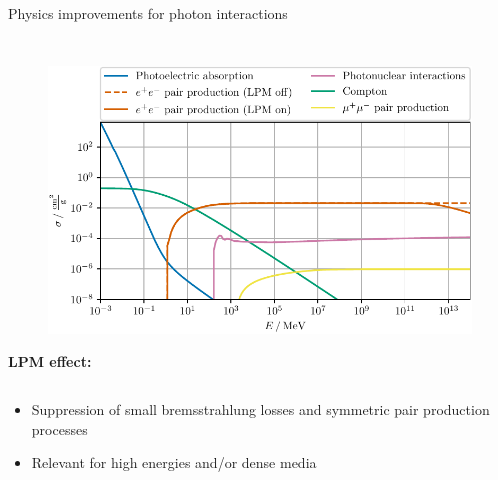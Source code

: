 \documentclass[t]{beamer}
\begin{document}
\begin{columns}[onlytextwidth]
\begin{column}{\textwidth}
\begin{block}{Physics improvements for photon interactions}
\begin{minipage}[t]{0.3\textwidth}
\begin{minipage}[t][12cm]{\textwidth}
\begin{columns}[onlytextwidth]
\begin{column}{0.35\textwidth}
\begin{figure}
                    \end{figure}
                \end{column}
            \end{columns}            
          \end{minipage}
        \end{minipage}
        \begin{minipage}[t]{0.4\textwidth}
          \begin{figure}
            \vspace{2cm}
            \includegraphics[width=0.9\linewidth, keepaspectratio]{../plots/Photon_Air_dndx_ecut_0.pdf}
          \end{figure}
        \end{minipage}
        \begin{minipage}[t]{0.3\textwidth}
          \begin{minipage}[t][12cm]{\textwidth}
            {\Large\textbf{LPM effect:}}
            \begin{columns}[onlytextwidth]
                \begin{column}{0.6\textwidth}%
                  \begin{itemize}[leftmargin=0.5cm]
                    \item Suppression of small bremsstrahlung losses and symmetric pair production processes
                    \item Relevant for high energies and/or dense media

                  \end{itemize}



\end{column}
\end{columns}
\end{minipage}
\end{minipage}
\end{block}
\end{column}
\end{columns}
\end{document}
